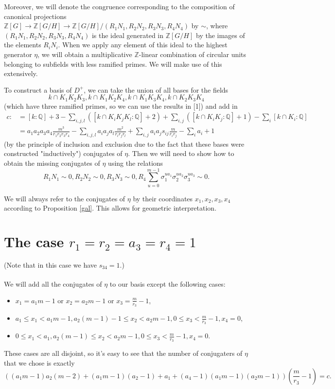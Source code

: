 \documentclass[12pt,a4paper]{article}
\newcommand{\Q}{\mathbb{Q}}
\newcommand{\Z}{\mathbb{Z}}
\begin{document}
Moreover, we will denote the congruence corresponding to the composition of canonical projections $\Z[G]\to \Z[G/H]\to \Z[G/H]/(R_1N_1,R_2N_2,R_3N_3,R_4N_4)$ by $\sim$, where $(R_1N_1,R_2N_2,R_3N_3,R_4N_4)$ is the ideal generated in $\Z[G/H]$ by the images of the elements $R_iN_i$. When we apply any element of this ideal to the highest generator $\eta$, we will obtain a multiplicative $\Z$-linear combination of circular units belonging to subfields with less ramified primes. We will make use of this extensively.

To construct a basis of $D^+$, we can take the union of all bases for the fields $$k\cap K_1K_2K_3,k\cap K_1K_2K_4,k\cap K_1K_3K_4,k\cap K_2K_3K_4$$ (which have three ramified primes, so we can use the results in [1]) and add in
\begin{equation*}
\begin{split}
c:&=[k:\Q]+3-\sum_{i,j,l}([k\cap K_iK_jK_l:\Q]+2)+\sum_{i,j}([k\cap K_iK_j:\Q]+1)-\sum_{i}[k\cap K_i:\Q]\\&=a_1a_2a_3a_4\frac{m^3}{r_1r_2r_3r_4}-\sum_{i,j,l}a_ia_ja_l\frac{m^2}{r_ir_jr_l}+\sum_{i,j}
a_ia_js_{ij}\frac{m}{r_ir_j}-\sum_{i}a_i+1
\end{split}
\end{equation*}
(by the principle of inclusion and exclusion due to the fact that these bases were constructed "inductively") conjugates of $\eta$. Then we will need to show how to obtain the missing conjugates of $\eta$ using the relations $$R_1N_1\sim 0, R_2N_2\sim 0, R_3N_3\sim 0, R_4\sum_{u=0}^{m-1}\sigma_1^{ua_1}\sigma_2^{ua_2}\sigma_3^{ua_3}\sim 0.$$

We will always refer to the conjugates of $\eta$ by their coordinates $x_1,x_2,x_3,x_4$ according to Proposition \ref{gal}. This allows for geometric interpretation.

\section{The case $r_1=r_2=a_3=r_4=1$}
(Note that in this case we have $s_{34}=1$.) %
\paragraph*{}
We will add all the conjugates of $\eta$ to our basis except the following cases:
\begin{itemize}
\item $x_1=a_1m-1$ or $x_2=a_2m-1$ or $x_3=\frac{m}{r_3}-1$,
\item $a_1\leq x_1 < a_1m-1, a_2(m-1)-1 \leq x_2 < a_2m-1, 0\leq x_3 < \frac{m}{r_3}-1, x_4=0$,
\item $0\leq x_1 < a_1, a_2(m-1) \leq x_2 < a_2m-1, 0\leq x_3 < \frac{m}{r_3}-1, x_4=0$.
\end{itemize}
These cases are all disjoint, so it's easy to see that the number of conjugaters of $\eta$ that we chose is exactly
$$((a_1m-1)a_2(m-2)+(a_1m-1)(a_2-1)+a_1+(a_4-1)(a_1m-1)(a_2m-1))\left(\frac{m}{r_3}-1\right)=c.$$
\end{document}
